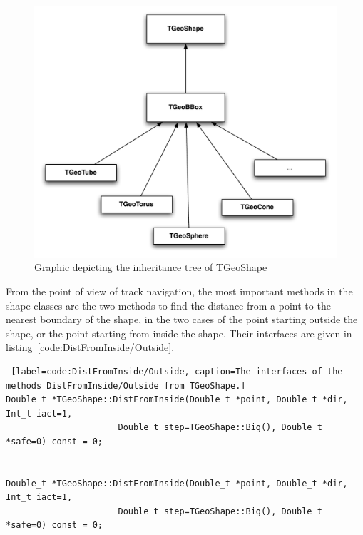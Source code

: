 \documentclass[11pt,a4paper,oneside]{article}
\begin{document}
\begin{figure}[!htbp] 
\begin{center}
\includegraphics[scale=0.5]{designdocumentimages/ShapeInheritance}
\end{center}
\caption{Graphic depicting the inheritance tree of TGeoShape}
\label{fig:ShapeInheritance}
\end{figure}

From the point of view of track navigation, the most important methods in the shape classes are the two methods to find the distance from a point to the nearest boundary of the shape, in the two cases of the point starting outside the shape, or the point starting from inside the shape. Their interfaces are given in listing~\ref{code:DistFromInside/Outside}.

\begin{sourcecode} 
\begin{lstlisting} [label=code:DistFromInside/Outside, caption=The interfaces of the methods DistFromInside/Outside from TGeoShape.]
Double_t *TGeoShape::DistFromInside(Double_t *point, Double_t *dir, Int_t iact=1, 
                      Double_t step=TGeoShape::Big(), Double_t *safe=0) const = 0;


Double_t *TGeoShape::DistFromInside(Double_t *point, Double_t *dir, Int_t iact=1, 
                      Double_t step=TGeoShape::Big(), Double_t *safe=0) const = 0;

\end{lstlisting} 
\end{sourcecode}
\end{document}

